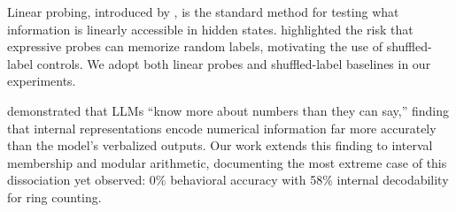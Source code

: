 Linear probing, introduced by \citet{alain2017understanding}, is the standard method for testing what information is linearly accessible in hidden states. \citet{hewitt2019designing} highlighted the risk that expressive probes can memorize random labels, motivating the use of shuffled-label controls. We adopt both linear probes and shuffled-label baselines in our experiments.

\citet{yuchi2026llms} demonstrated that LLMs ``know more about numbers than they can say,'' finding that internal representations encode numerical information far more accurately than the model's verbalized outputs. Our work extends this finding to interval membership and modular arithmetic, documenting the most extreme case of this dissociation yet observed: 0\% behavioral accuracy with 58\% internal decodability for ring counting.
